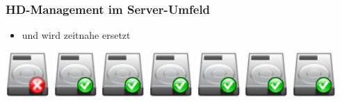 \documentclass{beamer}
\begin{document}
  \frame
  {
    \frametitle{HD-Management im Server-Umfeld}

    \begin{itemize}
    \item{und wird zeitnahe ersetzt}
    \end{itemize}

    \resizebox{40pt}{40pt}
    {
      \includegraphics{img/hdd_big_critical.png}
    }
    \resizebox{40pt}{40pt}
    {
      \includegraphics{img/hdd_big_ok.png}
    }
    \resizebox{40pt}{40pt}
    {
      \includegraphics{img/hdd_big_ok.png}
    }
    \resizebox{40pt}{40pt}
    {
      \includegraphics{img/hdd_big_ok.png}
    }
    \resizebox{40pt}{40pt}
    {
      \includegraphics{img/hdd_big_ok.png}
    }
    \resizebox{40pt}{40pt}
    {
      \includegraphics{img/hdd_big_ok.png}
    }
    \resizebox{40pt}{40pt}
    {
      \includegraphics{img/hdd_big_ok.png}
    }
  }
\end{document}
